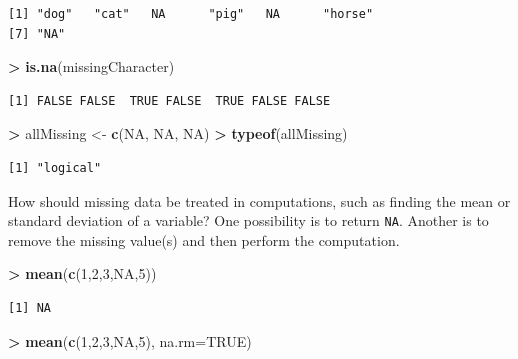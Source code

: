 \documentclass[]{krantz}
\makeatletter
\newenvironment{Shaded}{\begin{snugshade}}{\end{snugshade}}
\newcommand{\KeywordTok}[1]{\textcolor[rgb]{0.27,0.27,0.27}{\textbf{#1}}}
\newcommand{\DataTypeTok}[1]{\textcolor[rgb]{0.27,0.27,0.27}{#1}}
\newcommand{\DecValTok}[1]{\textcolor[rgb]{0.06,0.06,0.06}{#1}}
\newcommand{\StringTok}[1]{\textcolor[rgb]{0.5,0.5,0.5}{#1}}
\newcommand{\OtherTok}[1]{\textcolor[rgb]{0.37,0.37,0.37}{#1}}
\newcommand{\OperatorTok}[1]{\textcolor[rgb]{0.43,0.43,0.43}{\textbf{#1}}}
\newcommand{\NormalTok}[1]{#1}
\newenvironment{kframe}{%
\medskip{}
\setlength{\fboxsep}{.8em}
 \def\at@end@of@kframe{}%
 \ifinner\ifhmode%
  \def\at@end@of@kframe{\end{minipage}}%
  \begin{minipage}{\columnwidth}%
 \fi\fi%
 \def\FrameCommand##1{\hskip\@totalleftmargin \hskip-\fboxsep
 \colorbox{shadecolor}{##1}\hskip-\fboxsep
     \hskip-\linewidth \hskip-\@totalleftmargin \hskip\columnwidth}%
 \MakeFramed {\advance\hsize-\width
   \@totalleftmargin\z@ \linewidth\hsize
   \@setminipage}}%
 {\par\unskip\endMakeFramed%
 \at@end@of@kframe}
\renewenvironment{Shaded}{\begin{kframe}}{\end{kframe}}
\makeatother
\begin{document}
\begin{verbatim}
[1] "dog"   "cat"   NA      "pig"   NA      "horse"
[7] "NA"   
\end{verbatim}

\begin{Shaded}
\begin{Highlighting}[]
\OperatorTok{>}\StringTok{ }\KeywordTok{is.na}\NormalTok{(missingCharacter)}
\end{Highlighting}
\end{Shaded}

\begin{verbatim}
[1] FALSE FALSE  TRUE FALSE  TRUE FALSE FALSE
\end{verbatim}

\begin{Shaded}
\begin{Highlighting}[]
\OperatorTok{>}\StringTok{ }\NormalTok{allMissing <-}\StringTok{ }\KeywordTok{c}\NormalTok{(}\OtherTok{NA}\NormalTok{, }\OtherTok{NA}\NormalTok{, }\OtherTok{NA}\NormalTok{)}
\OperatorTok{>}\StringTok{ }\KeywordTok{typeof}\NormalTok{(allMissing)}
\end{Highlighting}
\end{Shaded}

\begin{verbatim}
[1] "logical"
\end{verbatim}

How should missing data be treated in computations, such as finding the
mean or standard deviation of a variable? One possibility is to return
\texttt{NA}. Another is to remove the missing value(s) and then perform
the computation.

\begin{Shaded}
\begin{Highlighting}[]
\OperatorTok{>}\StringTok{ }\KeywordTok{mean}\NormalTok{(}\KeywordTok{c}\NormalTok{(}\DecValTok{1}\NormalTok{,}\DecValTok{2}\NormalTok{,}\DecValTok{3}\NormalTok{,}\OtherTok{NA}\NormalTok{,}\DecValTok{5}\NormalTok{))}
\end{Highlighting}
\end{Shaded}

\begin{verbatim}
[1] NA
\end{verbatim}

\begin{Shaded}
\begin{Highlighting}[]
\OperatorTok{>}\StringTok{ }\KeywordTok{mean}\NormalTok{(}\KeywordTok{c}\NormalTok{(}\DecValTok{1}\NormalTok{,}\DecValTok{2}\NormalTok{,}\DecValTok{3}\NormalTok{,}\OtherTok{NA}\NormalTok{,}\DecValTok{5}\NormalTok{), }\DataTypeTok{na.rm=}\OtherTok{TRUE}\NormalTok{)}
\end{Highlighting}
\end{Shaded}
\end{document}
